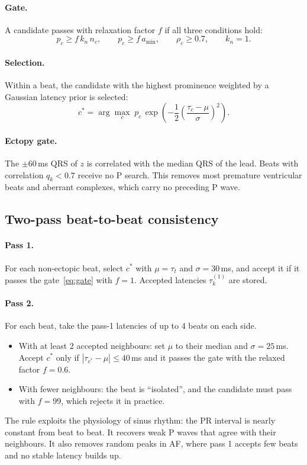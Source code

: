 \documentclass[11pt,a4paper]{article}
\begin{document}
\paragraph{Gate.} A candidate passes with relaxation factor $f$ if all three conditions hold:
\begin{equation}
p_c \ge f\,k_n\,n_c, \qquad p_c \ge f\,a_\mathrm{min}, \qquad \rho_c \ge 0.7, \qquad k_n = 1.
\label{eq:gate}
\end{equation}

\paragraph{Selection.} Within a beat, the candidate with the highest prominence weighted by a Gaussian latency prior is selected:
\begin{equation}
c^* = \arg\max_c \; p_c \, \exp\!\left(-\frac{1}{2}\left(\frac{\tau_c - \mu}{\sigma}\right)^2\right).
\end{equation}

\paragraph{Ectopy gate.} The $\pm60$\,ms QRS of $z$ is correlated with the median QRS of the lead. Beats with correlation $q_k < 0.7$ receive no P search. This removes most premature ventricular beats and aberrant complexes, which carry no preceding P wave.

\subsection{Two-pass beat-to-beat consistency}
\label{sec:consistency}

\paragraph{Pass 1.} For each non-ectopic beat, select $c^*$ with $\mu = \tau_t$ and $\sigma = 30$\,ms, and accept it if it passes the gate~\eqref{eq:gate} with $f = 1$. Accepted latencies $\tau^{(1)}_k$ are stored.

\paragraph{Pass 2.} For each beat, take the pass-1 latencies of up to 4 beats on each side.
\begin{itemize}
\item With at least 2 accepted neighbours: set $\mu$ to their median and $\sigma = 25$\,ms. Accept $c^*$ only if $|\tau_{c^*} - \mu| \le 40$\,ms and it passes the gate with the relaxed factor $f = 0.6$.
\item With fewer neighbours: the beat is ``isolated'', and the candidate must pass with $f = 99$, which rejects it in practice.
\end{itemize}
The rule exploits the physiology of sinus rhythm: the PR interval is nearly constant from beat to beat. It recovers weak P waves that agree with their neighbours. It also removes random peaks in AF, where pass 1 accepts few beats and no stable latency builds up.
\end{document}
